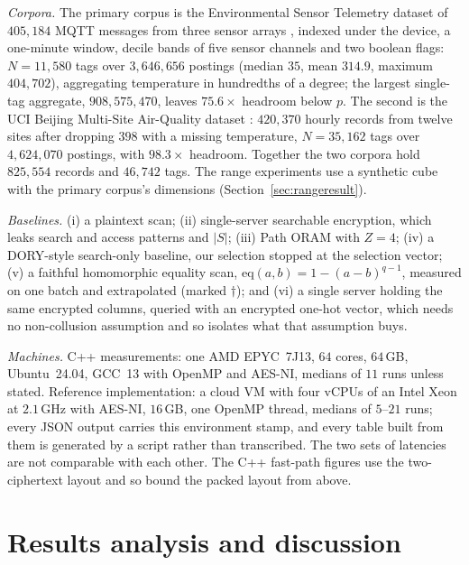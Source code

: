 \documentclass[a4paper,fleqn]{cas-sc}
\newif\ifauthorchecks
\newcommand{\authorcheck}[1]{\ifauthorchecks{\color{red}\textsf{[Authors: #1]}}\fi}
\begin{document}
\emph{Corpora.} The primary corpus is the Environmental Sensor Telemetry
dataset of $405{,}184$ MQTT messages from three sensor arrays
\citep{stafford_2020_environmental}, indexed under the device, a one-minute
window, decile bands of five sensor channels and two boolean flags:
$N=11{,}580$ tags over $3{,}646{,}656$ postings (median $35$, mean $314.9$,
maximum $404{,}702$), aggregating temperature in hundredths of a degree;
the largest single-tag aggregate, $908{,}575{,}470$, leaves $75.6\times$
headroom below $p$. The second is the UCI Beijing Multi-Site Air-Quality
dataset \citep{zhang2017cautionary,chen2019beijing}: $420{,}370$ hourly records
from twelve sites after dropping $398$ with a missing temperature, $N=35{,}162$
tags over $4{,}624{,}070$ postings, with $98.3\times$ headroom. Together the two
corpora hold $825{,}554$ records and $46{,}742$ tags. The range experiments use a synthetic cube with the primary corpus's
dimensions (Section~\ref{sec:rangeresult}).

\emph{Baselines.} (i) a plaintext scan; (ii) single-server searchable
encryption, which leaks search and access patterns and $|S|$; (iii) Path ORAM
with $Z=4$; (iv) a DORY-style \citep{dory} search-only baseline, our selection
stopped at the selection vector; (v) a faithful homomorphic equality scan,
$\mathrm{eq}(a,b)=1-(a-b)^{q-1}$, measured on one batch and extrapolated (marked
$\dagger$); and (vi) a single server holding the same encrypted columns,
queried with an encrypted one-hot vector, which needs no non-collusion
assumption and so isolates what that assumption buys.

\emph{Machines.} C++ measurements: one AMD EPYC~7J13, $64$ cores, $64$\,GB,
Ubuntu~24.04, GCC~13 with OpenMP and AES-NI, medians of $11$ runs unless
stated. Reference implementation: a cloud VM with
four vCPUs of an Intel Xeon at $2.1$\,GHz with AES-NI, $16$\,GB, one OpenMP
thread, medians of $5$--$21$ runs; every JSON output carries this environment
stamp, and every table built from them is generated by a script rather than
transcribed. The two sets of latencies are not comparable with each other. The
C++ fast-path figures use the two-ciphertext layout and so bound the packed
layout from above. \authorcheck{Re-measure Tables~\ref{tab:compute},
\ref{tab:baselines} and~\ref{tab:wan} with the packed, compressed layout in
C++.}

\section{Results analysis and discussion}
\label{sec:resultsdisc}
\end{document}
